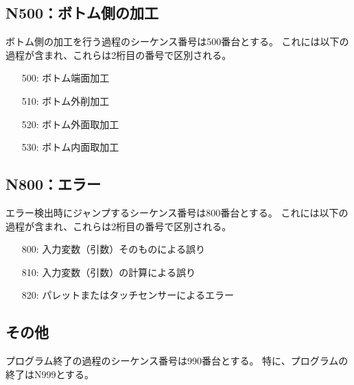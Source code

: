 \subsection{N500：ボトム側の加工}
ボトム側の加工を行う過程のシーケンス番号は500番台とする。
これには以下の過程が含まれ、これらは2桁目の番号で区別される。
\begin{enumerate}
\item[500:] ボトム端面加工
\item[510:] ボトム外削加工
\item[520:] ボトム外面取加工
\item[530:] ボトム内面取加工
\end{enumerate}


\subsection{N800：エラー}
エラー検出時にジャンプするシーケンス番号は800番台とする。
これには以下の過程が含まれ、これらは2桁目の番号で区別される。
\begin{enumerate}
\item[800:] 入力変数（引数）そのものによる誤り
\item[810:] 入力変数（引数）の計算による誤り
\item[820:] パレットまたはタッチセンサーによるエラー
\end{enumerate}


\subsection{その他}
プログラム終了の過程のシーケンス番号は990番台とする。
特に、プログラムの終了はN999とする。\\


